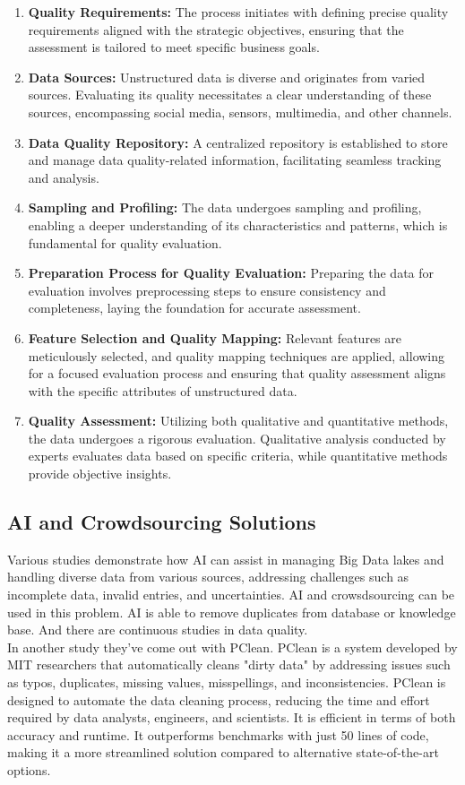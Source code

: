 \documentclass[10pt,a4paper]{article}
\begin{document}
\begin{enumerate}
\item \textbf{Quality Requirements:} The process initiates with defining precise quality requirements aligned with the strategic objectives, ensuring that the assessment is tailored to meet specific business goals.
\item \textbf{Data Sources:} Unstructured data is diverse and originates from varied sources. Evaluating its quality necessitates a clear understanding of these sources, encompassing social media, sensors, multimedia, and other channels.
\item \textbf{Data Quality Repository:} A centralized repository is established to store and manage data quality-related information, facilitating seamless tracking and analysis.
\item \textbf{Sampling and Profiling:} The data undergoes sampling and profiling, enabling a deeper understanding of its characteristics and patterns, which is fundamental for quality evaluation.
\item \textbf{Preparation Process for Quality Evaluation:} Preparing the data for evaluation involves preprocessing steps to ensure consistency and completeness, laying the foundation for accurate assessment.
\item \textbf{Feature Selection and Quality Mapping:} Relevant features are meticulously selected, and quality mapping techniques are applied, allowing for a focused evaluation process and ensuring that quality assessment aligns with the specific attributes of unstructured data.
\item \textbf{Quality Assessment:} Utilizing both qualitative and quantitative methods, the data undergoes a rigorous evaluation. Qualitative analysis conducted by experts evaluates data based on specific criteria, while quantitative methods provide objective insights.
\end{enumerate}
\cite{8605945}

\subsection{AI and Crowdsourcing Solutions}

Various studies demonstrate how AI can assist in managing Big Data lakes and handling diverse data from various sources, addressing challenges such as incomplete data, invalid entries, and uncertainties.
AI and crowsdsourcing can be used in this problem. AI is able to remove duplicates from database or knowledge base. And there are continuous studies in data quality.\cite{6949519}
\\
In another study they've come out with PClean. PClean is a system developed by MIT researchers that automatically cleans "dirty data" by addressing issues such as typos, duplicates, missing values, misspellings, and inconsistencies.\cite{lew2021pclean}
PClean is designed to automate the data cleaning process, reducing the time and effort required by data analysts, engineers, and scientists. It is efficient in terms of both accuracy and runtime. It outperforms benchmarks with just 50 lines of code, making it a more streamlined solution compared to alternative state-of-the-art options. \cite{lew2021pclean}
\end{document}
